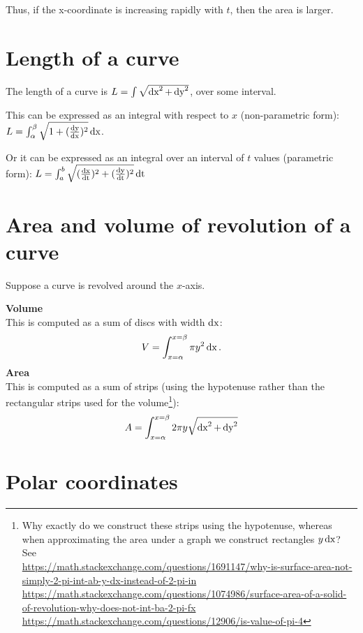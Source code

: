 \documentclass[12pt]{article}
\begin{document}
Thus, if the x-coordinate is increasing rapidly with $t$, then the area is
larger.

\section{Length of a curve}

The length of a curve is $L = \int \sqrt{\operatorname{\text{dx}}^2 + \operatorname{\text{dy}}^2}$, over some interval.

This can be expressed as an integral with respect to $x$ (non-parametric form):
$L = \int_\alpha^\beta \sqrt{1 + (\frac{\operatorname{\text{dy}}}{\operatorname{\text{dx}}})^2} \operatorname{\text{dx}}$.

Or it can be expressed as an integral over an interval of $t$ values (parametric form):
$L = \int_a^b \sqrt{ (\frac{\operatorname{\text{dx}}}{\operatorname{\text{dt}}})^2 + (\frac{\operatorname{\text{dy}}}{\operatorname{\text{dt}}})^2} \operatorname{\text{dt}}$

\section{Area and volume of revolution of a curve}
Suppose a curve is revolved around the $x$-axis.

\textbf{Volume}\\
This is computed as a sum of discs with width $\operatorname{\text{dx}}$:
\begin{align*}
  V = \int_{x=\alpha}^{x=\beta} \pi y^2 \operatorname{\text{dx}}.
\end{align*}
\textbf{Area}\\
This is computed as a sum of strips (using the hypotenuse rather than the rectangular strips used for the volume\footnote{Why exactly do we
  construct these strips using the hypotenuse, whereas when approximating the
  area under a graph we construct rectangles $y\operatorname{\text{dx}}$? See \\
  \url{https://math.stackexchange.com/questions/1691147/why-is-surface-area-not-simply-2-pi-int-ab-y-dx-instead-of-2-pi-in}\\
  \url{https://math.stackexchange.com/questions/1074986/surface-area-of-a-solid-of-revolution-why-does-not-int-ba-2-pi-fx}\\
  \url{https://math.stackexchange.com/questions/12906/is-value-of-pi-4}}):
\begin{align*}
  A = \int_{x=\alpha}^{x=\beta}  2\pi y \sqrt{\operatorname{\text{dx}}^2 + \operatorname{\text{dy}}^2}
\end{align*}


\section{Polar coordinates}
\end{document}
